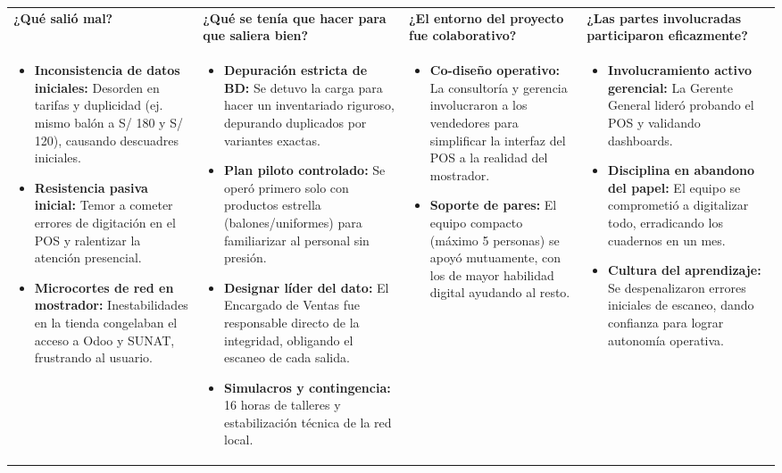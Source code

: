 \documentclass[11pt]{article}
\begin{document}
\newpage
\begin{longtable}{|p{3.8cm}|p{3.8cm}|p{3.8cm}|p{3.8cm}|}
\hline
\rowcolor{RoundGray}\multicolumn{4}{|l|}{\textbf{Segunda Ronda}} \\ \hline
\rowcolor{HeaderGray}\textbf{¿Qué salió mal?} & \textbf{¿Qué se tenía que hacer para que saliera bien?} & \textbf{¿El entorno del proyecto fue colaborativo?} & \textbf{¿Las partes involucradas participaron eficazmente?} \\ \hline
\begin{itemize}[leftmargin=*,nosep]
    \item \textbf{Inconsistencia de datos iniciales:} Desorden en tarifas y duplicidad (ej. mismo balón a S/ 180 y S/ 120), causando descuadres iniciales.
    \item \textbf{Resistencia pasiva inicial:} Temor a cometer errores de digitación en el POS y ralentizar la atención presencial.
    \item \textbf{Microcortes de red en mostrador:} Inestabilidades en la tienda congelaban el acceso a Odoo y SUNAT, frustrando al usuario.
\end{itemize} &
\begin{itemize}[leftmargin=*,nosep]
    \item \textbf{Depuración estricta de BD:} Se detuvo la carga para hacer un inventariado riguroso, depurando duplicados por variantes exactas.
    \item \textbf{Plan piloto controlado:} Se operó primero solo con productos estrella (balones/uniformes) para familiarizar al personal sin presión.
    \item \textbf{Designar líder del dato:} El Encargado de Ventas fue responsable directo de la integridad, obligando el escaneo de cada salida.
    \item \textbf{Simulacros y contingencia:} 16 horas de talleres y estabilización técnica de la red local.
\end{itemize} &
\begin{itemize}[leftmargin=*,nosep]
    \item \textbf{Co-diseño operativo:} La consultoría y gerencia involucraron a los vendedores para simplificar la interfaz del POS a la realidad del mostrador.
    \item \textbf{Soporte de pares:} El equipo compacto (máximo 5 personas) se apoyó mutuamente, con los de mayor habilidad digital ayudando al resto.
\end{itemize} &
\begin{itemize}[leftmargin=*,nosep]
    \item \textbf{Involucramiento activo gerencial:} La Gerente General lideró probando el POS y validando dashboards.
    \item \textbf{Disciplina en abandono del papel:} El equipo se comprometió a digitalizar todo, erradicando los cuadernos en un mes.
    \item \textbf{Cultura del aprendizaje:} Se despenalizaron errores iniciales de escaneo, dando confianza para lograr autonomía operativa.
\end{itemize} \\ \hline
\end{longtable}
\end{document}
